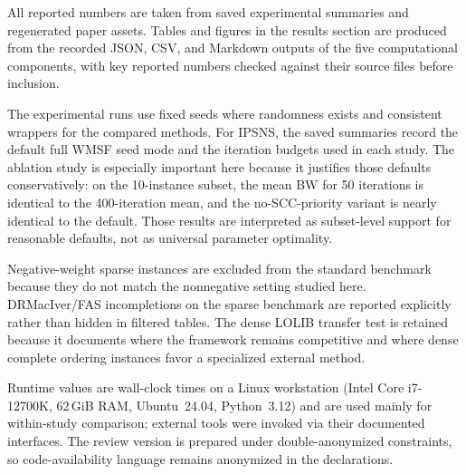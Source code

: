 All reported numbers are taken from saved experimental summaries and regenerated paper assets. Tables and figures in the results section are produced from the recorded JSON, CSV, and Markdown outputs of the five computational components, with key reported numbers checked against their source files before inclusion.

The experimental runs use fixed seeds where randomness exists and consistent wrappers for the compared methods. For IPSNS, the saved summaries record the default full WMSF seed mode and the iteration budgets used in each study. The ablation study is especially important here because it justifies those defaults conservatively: on the 10-instance subset, the mean BW for 50 iterations is identical to the 400-iteration mean, and the no-SCC-priority variant is nearly identical to the default. Those results are interpreted as subset-level support for reasonable defaults, not as universal parameter optimality.

Negative-weight sparse instances are excluded from the standard benchmark because they do not match the nonnegative setting studied here. DRMacIver/FAS incompletions on the sparse benchmark are reported explicitly rather than hidden in filtered tables. The dense LOLIB transfer test is retained because it documents where the framework remains competitive and where dense complete ordering instances favor a specialized external method.

Runtime values are wall-clock times on a Linux workstation (Intel Core i7-12700K, 62\,GiB RAM, Ubuntu~24.04, Python~3.12) and are used mainly for within-study comparison; external tools were invoked via their documented interfaces. The review version is prepared under double-anonymized constraints, so code-availability language remains anonymized in the declarations.
